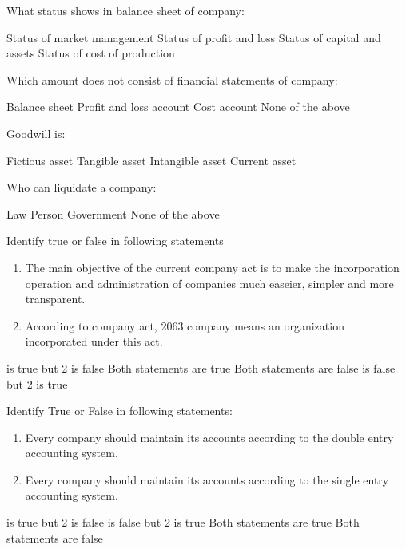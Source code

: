 \begin{questions}
\question What status shows in balance sheet of company:
  \begin{choices}
  \choice Status of market management
  \choice Status of profit and loss
  \choice Status of capital and assets
  \choice Status of cost of production
  \end{choices}

\question Which amount does not consist of financial statements of company:
  \begin{choices}
  \choice Balance sheet
  \choice Profit and loss account
  \choice Cost account
  \choice None of the above
  \end{choices}

\question Goodwill is:
  \begin{choices}
  \choice Fictious asset
  \choice Tangible asset
  \choice Intangible asset
  \choice Current asset
  \end{choices}

\question Who can liquidate a company:
  \begin{choices}
  \choice Law
  \choice Person
  \choice Government
  \choice None of the above
  \end{choices}

\question Identify true or false in following statements
  \begin{enumerate}
  \item The main objective of the current company act is to make the incorporation operation and administration of companies much easeier, simpler and more transparent.
  \item According to company act, 2063 company means an organization incorporated under this act.
  \end{enumerate}
  \begin{choices}
   is true but 2 is false
  \choice Both statements are true
  \choice Both statements are false
   is false but 2 is true
  \end{choices}

\question Identify True or False in following statements:
  \begin{enumerate}
  \item Every company should maintain its accounts according to the double entry accounting system.
  \item Every company should maintain its accounts according to the single entry accounting system.
  \end{enumerate}

  \begin{choices}
   is true but 2 is false
   is false but 2 is true
  \choice Both statements are true
  \choice Both statements are false
  \end{choices}


\end{questions}
